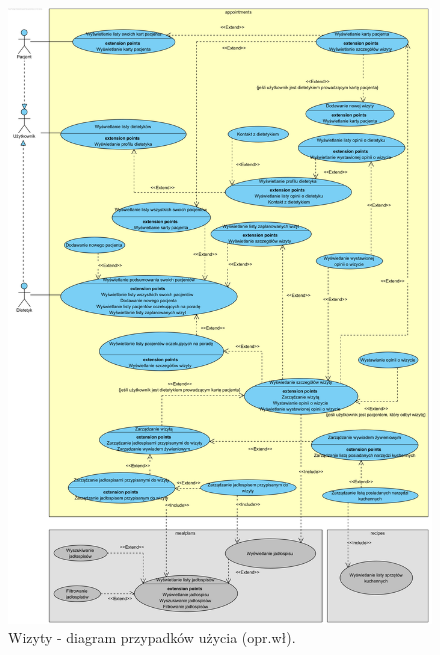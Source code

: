 \begin{minipage}{\textwidth}
    \begin{figure}[H]
        \centering\includegraphics[scale=0.55]{../uml/use_case_diagrams/appointments.png}
        \caption{Wizyty - diagram przypadków użycia (opr.wł).}\label{rysunek:use-case-diagram-appointments}
    \end{figure}
\end{minipage}

